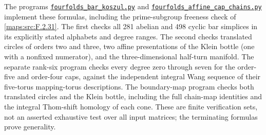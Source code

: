 The programs \href{https://github.com/KokunoYumeto/s6-complex-structure-workbench/blob/83d76022bcd442278b760db9ff438afceed6c6ea/pro_returns/S6_10_PAPERS_checkpoint_15_20261119T1045Z/S6_10_PAPERS/code/V/replay_chains/code/fourfolds_bar_koszul.py}{\texttt{fourfolds\_bar\_koszul.py}} and
\href{https://github.com/KokunoYumeto/s6-complex-structure-workbench/blob/83d76022bcd442278b760db9ff438afceed6c6ea/pro_returns/S6_10_PAPERS_checkpoint_15_20261119T1045Z/S6_10_PAPERS/code/V/replay_chains/code/fourfolds_affine_cap_chains.py}{\texttt{fourfolds\_affine\_cap\_chains.py}} implement these
formulas, including the prime-subgroup freeness check of \ref{maps:src:F.2.31}.
The first checks all 281 abelian and 498 cyclic bar simplices
in its explicitly stated alphabets and degree ranges.
The second checks translated circles of orders two and three,
two affine presentations of the Klein bottle (one with a
nonfixed numerator), and the three-dimensional half-turn
manifold.  The separate rank-six program checks every degree
zero through seven for the order-five and order-four caps,
against the independent integral Wang sequence of their
five-torus mapping-torus descriptions.
The boundary-map program checks both translated circles and
the Klein bottle, including the full chain-map identities and
the integral Thom-shift homology of each cone.  These are
finite verification sets, not an asserted exhaustive test over
all input matrices; the terminating formulas prove generality.







